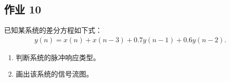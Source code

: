 \subsection{作业 10}

\begin{homework}
    已知某系统的差分方程如下式：
    \begin{align*}
        y(n) = x(n) + x(n - 3) + 0.7y(n - 1) + 0.6y(n - 2).
    \end{align*}
    \begin{enumerate}[label=(\arabic*)]
        \item 判断系统的脉冲响应类型。
        \item 画出该系统的信号流图。
    \end{enumerate}
\end{homework}

